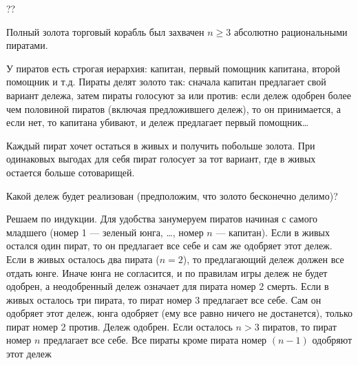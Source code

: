 \begin{problem}  \par
\begin{source}
\cite{mulen:gt}??
\end{source}
Полный золота торговый корабль был захвачен  $n\ge 3$  абсолютно рациональными пиратами. \par
У пиратов есть строгая иерархия: капитан, первый помощник капитана, второй помощник и т.д. Пираты делят золото так: сначала капитан предлагает свой вариант дележа, затем пираты голосуют за или против: если дележ одобрен более чем половиной пиратов (включая предложившего дележ), то он принимается, а если нет, то капитана убивают, и дележ предлагает первый помощник\ldots \par
Каждый пират хочет остаться в живых и получить побольше золота. При одинаковых выгодах для себя пират голосует за тот вариант, где в живых остается больше сотоварищей.\par
Какой дележ будет реализован (предположим, что золото бесконечно делимо)?

\begin{sol}
Решаем по индукции. Для удобства занумеруем пиратов начиная с самого младшего (номер 1 --- зеленый юнга, \ldots, номер $n$ --- капитан). Если в живых остался один пират, то он предлагает все себе и сам же одобряет этот дележ. Если в живых осталось два пирата ($n=2$), то предлагающий дележ должен все отдать юнге. Иначе юнга не согласится, и по правилам игры дележ не будет одобрен, а неодобренный дележ означает для пирата номер 2 смерть. Если в живых осталось три пирата, то пират номер 3 предлагает все себе. Сам он одобряет этот дележ, юнга одобряет (ему все равно ничего не достанется), только пират номер 2 против. Дележ одобрен. Если осталось $n>3$ пиратов, то пират номер $n$ предлагает все себе. Все пираты кроме пирата номер $(n-1)$ одобряют этот дележ
\end{sol}
\end{problem}






